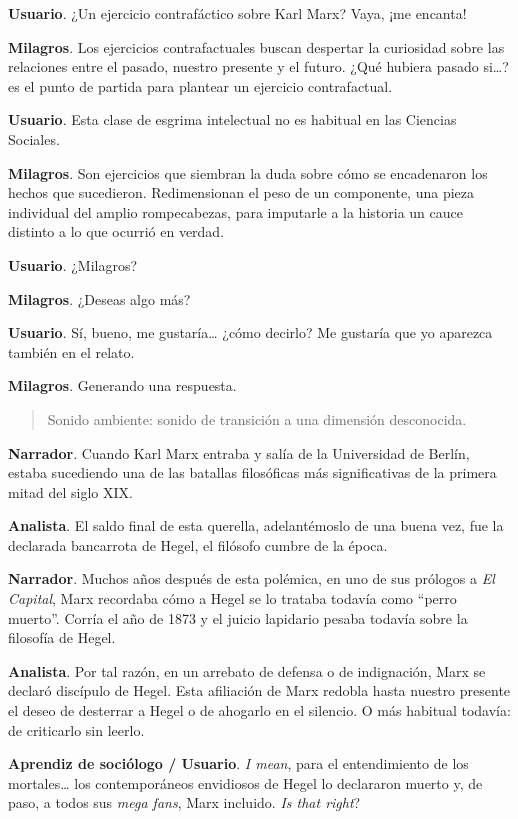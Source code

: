 \documentclass[
]{interact}
\begin{document}
\textbf{Usuario}. ¿Un ejercicio contrafáctico sobre Karl Marx? Vaya, ¡me
encanta!

\textbf{Milagros}. Los ejercicios contrafactuales buscan despertar la
curiosidad sobre las relaciones entre el pasado, nuestro presente y el
futuro. ¿Qué hubiera pasado si\ldots? es el punto de partida para
plantear un ejercicio contrafactual.

\textbf{Usuario}. Esta clase de esgrima intelectual no es habitual en
las Ciencias Sociales.

\textbf{Milagros}. Son ejercicios que siembran la duda sobre cómo se
encadenaron los hechos que sucedieron. Redimensionan el peso de un
componente, una pieza individual del amplio rompecabezas, para imputarle
a la historia un cauce distinto a lo que ocurrió en verdad.

\textbf{Usuario}. ¿Milagros?

\textbf{Milagros}. ¿Deseas algo más?

\textbf{Usuario}. Sí, bueno, me gustaría\ldots{} ¿cómo decirlo? Me
gustaría que yo aparezca también en el relato.

\textbf{Milagros}. Generando una respuesta.

\begin{quote}
Sonido ambiente: sonido de transición a una dimensión desconocida.
\end{quote}

\textbf{Narrador}. Cuando Karl Marx entraba y salía de la Universidad de
Berlín, estaba sucediendo una de las batallas filosóficas más
significativas de la primera mitad del siglo XIX.

\textbf{Analista}. El saldo final de esta querella, adelantémoslo de una
buena vez, fue la declarada bancarrota de Hegel, el filósofo cumbre de
la época.

\textbf{Narrador}. Muchos años después de esta polémica, en uno de sus
prólogos a \emph{El Capital}, Marx recordaba cómo a Hegel se lo trataba
todavía como ``perro muerto''. Corría el año de 1873 y el juicio
lapidario pesaba todavía sobre la filosofía de Hegel.

\textbf{Analista}. Por tal razón, en un arrebato de defensa o de
indignación, Marx se declaró discípulo de Hegel. Esta afiliación de Marx
redobla hasta nuestro presente el deseo de desterrar a Hegel o de
ahogarlo en el silencio. O más habitual todavía: de criticarlo sin
leerlo.

\textbf{Aprendiz de sociólogo / Usuario}. \emph{I mean}, para el
entendimiento de los mortales\ldots{} los contemporáneos envidiosos de
Hegel lo declararon muerto y, de paso, a todos sus \emph{mega fans},
Marx incluido. \emph{Is that right}?
\end{document}
